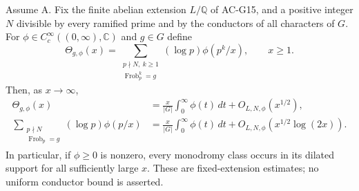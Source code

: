 \begin{theorem}
\label{AC-G16}
Assume A.  Fix the finite abelian extension $L/\mathbb Q$ of AC-G15,
and a positive integer $N$ divisible by every ramified prime and by
the conductors of all characters of $G$.  For
$\phi\in C_c^\infty((0,\infty),\mathbb C)$ and $g\in G$ define
\[
 \Theta_{g,\phi}(x)=
 \sum_{\substack{p\nmid N,\ k\geq1\\
                 \operatorname{Frob}_p^{k}=g}}
        (\log p)\phi(p^k/x),\qquad x\geq1.
\]
Then, as $x\to\infty$,
\begin{align*}
 \Theta_{g,\phi}(x)
   &=\frac{x}{|G|}\int_0^\infty\phi(t)\,dt
       +O_{L,N,\phi}(x^{1/2}),\\
 \sum_{\substack{p\nmid N\\\operatorname{Frob}_p=g}}
       (\log p)\phi(p/x)
   &=\frac{x}{|G|}\int_0^\infty\phi(t)\,dt
       +O_{L,N,\phi}(x^{1/2}\log(2x)).
\end{align*}
In particular, if $\phi\geq0$ is nonzero, every monodromy class occurs
in its dilated support for all sufficiently large $x$.  These are
fixed-extension estimates; no uniform conductor bound is asserted.
\end{theorem}
